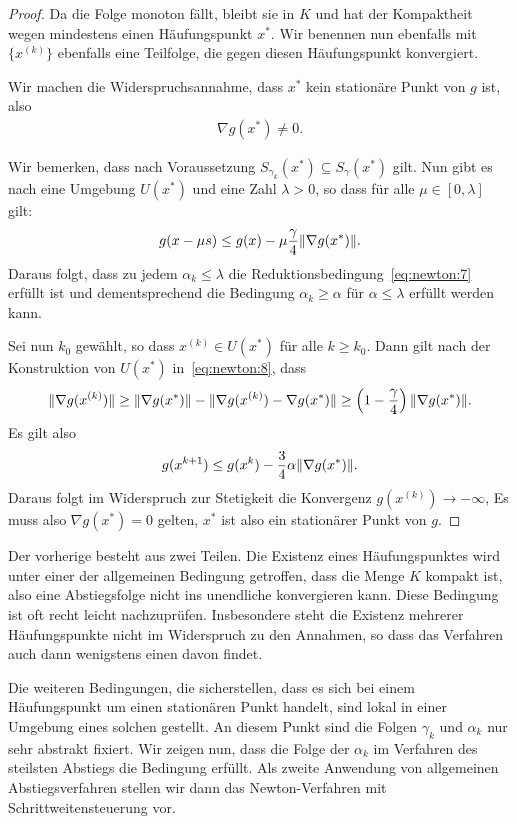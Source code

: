 \begin{proof}
  Da die Folge monoton fällt, bleibt sie in $K$ und hat der
  Kompaktheit wegen mindestens einen Häufungspunkt $x^*$. Wir benennen
  nun ebenfalls mit $\{x^{(k)}\}$ ebenfalls eine Teilfolge, die gegen diesen
  Häufungspunkt konvergiert.

  Wir machen die Widerspruchsannahme, dass $x^*$ kein stationäre Punkt von $g$ ist, also
  \begin{gather}
    \nabla g(x^*) \neq 0.
  \end{gather}

  Wir bemerken, dass nach Voraussetzung $S_{\gamma_k}(x^*) \subseteq S_\gamma(x^*)$ gilt.
  Nun gibt es nach  eine Umgebung
  $U(x^*)$ und eine Zahl $\lambda>0$, so dass für alle $\mu\in[0,\lambda]$ gilt:
  \begin{gather}
    g(x-\mu s) \le g(x) - \mu \frac\gamma4\lVert\nabla g(x^*)\rVert.
  \end{gather}
  Daraus folgt, dass zu jedem $\alpha_k \le \lambda$ die
  Reduktionsbedingung~\eqref{eq:newton:7} erfüllt ist und
  dementsprechend die Bedingung $\alpha_k\ge\alpha$ für
  $\alpha\le\lambda$ erfüllt werden kann.

  Sei nun $k_0$ gewählt, so dass $x^{(k)}\in U(x^*)$ für alle
  $k\ge k_0$. Dann gilt nach der Konstruktion von $U(x^*)$
  in~\eqref{eq:newton:8}, dass
  \begin{gather}
    \lVert\nabla g(x^{(k)})\rVert \ge \lVert\nabla g(x^{*})\rVert - \lVert\nabla g(x^{(k)}) - \nabla g(x^{*})\rVert
    \ge \left(1-\frac\gamma4\right)  \lVert\nabla g(x^{*})\rVert.
  \end{gather}
  Es gilt also
  \begin{gather}
    g(x^{k+1}) \le g(x^{k}) - \frac34 \alpha \lVert\nabla g(x^{*})\rVert.
  \end{gather}
  Daraus folgt im Widerspruch zur Stetigkeit die Konvergenz
  $g(x^{(k)}) \to -\infty$, Es muss also $\nabla g(x^{*})=0$ gelten,
  $x^*$ ist also ein stationärer Punkt von $g$.
\end{proof}

\begin{remark}
  Der vorherige besteht aus zwei Teilen. Die Existenz eines
  Häufungspunktes wird unter einer der allgemeinen Bedingung
  getroffen, dass die Menge $K$ kompakt ist, also eine Abstiegsfolge
  nicht ins unendliche konvergieren kann. Diese Bedingung ist oft
  recht leicht nachzuprüfen. Insbesondere steht die Existenz mehrerer
  Häufungspunkte nicht im Widerspruch zu den Annahmen, so dass das
  Verfahren auch dann wenigstens einen davon findet.

  Die weiteren Bedingungen, die sicherstellen, dass es sich bei einem
  Häufungspunkt um einen stationären Punkt handelt, sind lokal in
  einer Umgebung eines solchen gestellt. An diesem Punkt sind die
  Folgen $\gamma_k$ und $\alpha_k$ nur sehr abstrakt fixiert. Wir
  zeigen nun, dass die Folge der $\alpha_k$ im Verfahren des steilsten
  Abstiegs die Bedingung erfüllt. Als zweite Anwendung von allgemeinen
  Abstiegsverfahren stellen wir dann das Newton-Verfahren mit
  Schrittweitensteuerung vor.
\end{remark}

